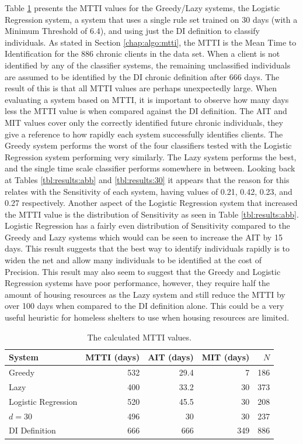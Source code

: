 Table \ref{tbl:results:mtti} presents the MTTI values for the Greedy/Lazy systems, the Logistic Regression system, a system that uses a single rule set trained on 30 days (with a Minimum Threshold of 6.4), and using just the DI definition to classify individuals.
As stated in Section \ref{chap:algo:mtti}, the MTTI is the Mean Time to Identification for the 886 chronic clients in the data set. When a client is not identified by any of the classifier systems, the remaining unclassified individuals are assumed to be identified by the DI chronic definition after 666 days. The result of this is that all MTTI values are perhaps unexpectedly large. When evaluating a system based on MTTI, it is important to observe how many days less the MTTI value is when compared against the DI definition. The AIT and MIT values cover only the correctly identified future chronic individuals, they give a reference to how rapidly each system successfully identifies clients.
The Greedy system performs the worst of the four classifiers tested with the Logistic Regression system performing very similarly. The Lazy system performs the best, and the single time scale classifier performs somewhere in between. Looking back at Tables \ref{tbl:results:abb} and \ref{tbl:results:30} it appears that the reason for this relates with the Sensitivity of each system, having values of 0.21, 0.42, 0.23, and 0.27 respectively.
Another aspect of the Logistic Regression system that increased the MTTI value is the distribution of Sensitivity as seen in Table \ref{tbl:results:abb}. Logistic Regression has a fairly even distribution of Sensitivity compared to the Greedy and Lazy systems which would can be seen to increase the AIT by 15 days. 
This result suggests that the best way to identify individuals rapidly is to widen the net and allow many individuals to be identified at the cost of Precision.
This result may also seem to suggest that the Greedy and Logistic Regression systems have poor performance, however, they require half the amount of housing resources as the Lazy system and still reduce the MTTI by over 100 days when compared to the DI definition alone. This could be a very useful heuristic for homeless shelters to use when housing resources are limited.


\begin{table}[h]
	\centering

	\begin{tabular}{lrrrr}
	\toprule
	{System} &  MTTI (days) & AIT (days) & MIT (days) & $N$ \\
	\midrule
	Greedy & 532 & 29.4 & 7 & 186 \\
	Lazy & 400 & 33.2 & 30 & 373 \\
	Logistic Regression & 520 & 45.5 & 30 & 208 \\
	$d=30$ & 496 & 30 & 30 & 237 \\
	DI Definition & 666 & 666 & 349 & 886 \\

	\bottomrule
	\end{tabular}

	\caption{The calculated MTTI values.}
	\label{tbl:results:mtti}
\end{table}

